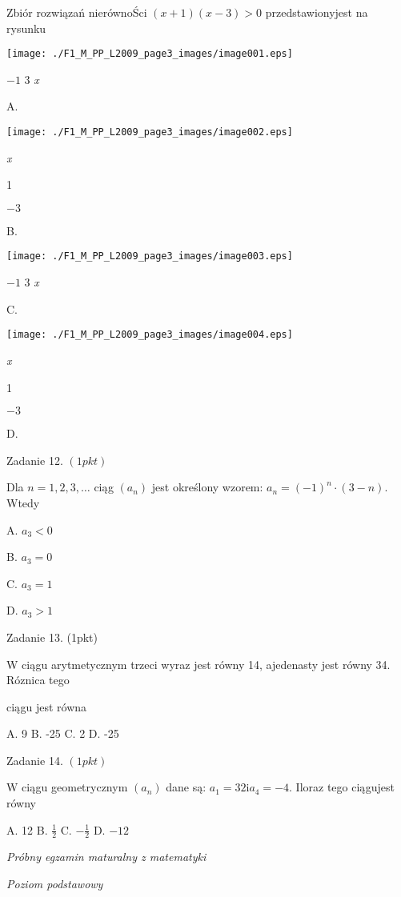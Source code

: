\documentclass[a4paper,12pt]{article}
\begin{document}
Zbiór rozwiązań nierównoŚci $(x+1)(x-3)>0$ przedstawionyjest na rysunku
\begin{center}
\texttt{[image: ./F1\_M\_PP\_L2009\_page3\_images/image001.eps]}
\end{center}
$-1$  3  {\it x}

A.
\begin{center}
\texttt{[image: ./F1\_M\_PP\_L2009\_page3\_images/image002.eps]}
\end{center}
{\it x}

1

$-3$

B.
\begin{center}
\texttt{[image: ./F1\_M\_PP\_L2009\_page3\_images/image003.eps]}
\end{center}
$-1$  3  {\it x}

C.
\begin{center}
\texttt{[image: ./F1\_M\_PP\_L2009\_page3\_images/image004.eps]}
\end{center}
{\it x}

1

$-3$

D.

Zadanie 12. $(1pkt)$

Dla $ n=1,2,3,\ldots$ ciąg $(a_{n})$ jest określony wzorem: $a_{n}=(-1)^{n}\cdot(3-n)$. Wtedy

A. $a_{3}<0$

B. $a_{3}=0$

C. $a_{3}=1$

D. $a_{3}>1$

Zadanie 13. (1pkt)

W ciągu arytmetycznym trzeci wyraz jest równy 14, ajedenasty jest równy 34. Róznica tego

ciągu jest równa

A. 9 B. -25 C. 2 D. -25

Zadanie 14. $(1pkt)$

$\mathrm{W}$ ciągu geometrycznym $(a_{n})$ dane są: $a_{1}=32 \mathrm{i}a_{4}=-4$. Iloraz tego ciągujest równy

A. 12 B. $\displaystyle \frac{1}{2}$ C. $-\displaystyle \frac{1}{2}$ D. $-12$





{\it Próbny egzamin maturalny z matematyki}

{\it Poziom podstawowy}
\end{document}
